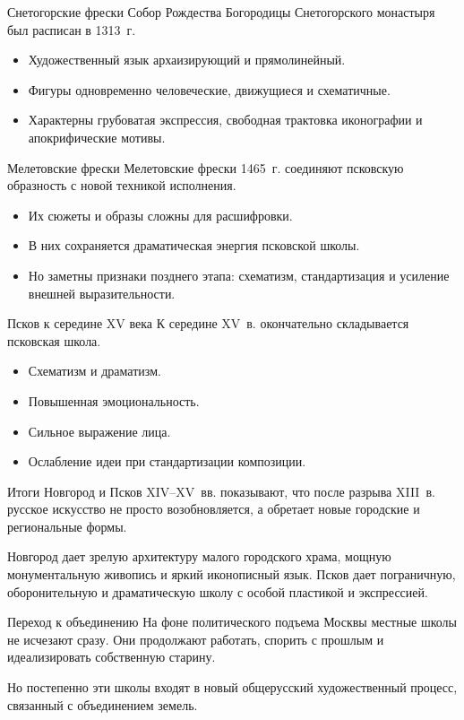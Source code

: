 \begin{frame}{Снетогорские фрески}
  Собор Рождества Богородицы Снетогорского монастыря был расписан
  в 1313~г.

  \begin{itemize}
    \item Художественный язык архаизирующий и прямолинейный.
    \item Фигуры одновременно человеческие, движущиеся
          и схематичные.
    \item Характерны грубоватая экспрессия, свободная трактовка
          иконографии и апокрифические мотивы.
  \end{itemize}
\end{frame}

\begin{frame}{Мелетовские фрески}
  Мелетовские фрески 1465~г. соединяют псковскую образность
  с новой техникой исполнения.

  \begin{itemize}
    \item Их сюжеты и образы сложны для расшифровки.
    \item В них сохраняется драматическая энергия псковской школы.
    \item Но заметны признаки позднего этапа: схематизм,
          стандартизация и усиление внешней выразительности.
  \end{itemize}
\end{frame}

\begin{frame}{Псков к середине XV века}
  К середине XV~в. окончательно складывается псковская школа.

  \begin{itemize}
    \item Схематизм и драматизм.
    \item Повышенная эмоциональность.
    \item Сильное выражение лица.
    \item Ослабление идеи при стандартизации композиции.
  \end{itemize}
\end{frame}

\begin{frame}{Итоги}
  Новгород и Псков XIV--XV~вв. показывают, что после разрыва XIII~в.
  русское искусство не просто возобновляется, а обретает новые
  городские и региональные формы.

  \vspace{0.8em}
  Новгород дает зрелую архитектуру малого городского храма,
  мощную монументальную живопись и яркий иконописный язык.
  Псков дает пограничную, оборонительную и драматическую школу
  с особой пластикой и экспрессией.
\end{frame}

\begin{frame}{Переход к объединению}
  На фоне политического подъема Москвы местные школы не исчезают сразу.
  Они продолжают работать, спорить с прошлым и идеализировать собственную
  старину.

  \vspace{0.8em}
  Но постепенно эти школы входят в новый общерусский художественный
  процесс, связанный с объединением земель.
\end{frame}
